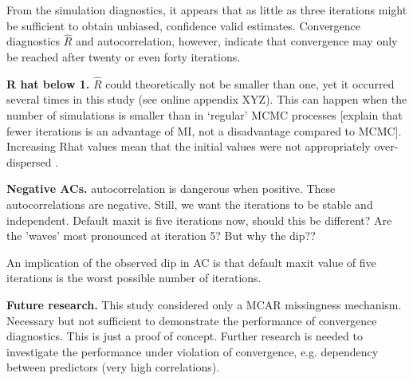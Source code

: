 \documentclass[article]{jss}
\begin{document}
From the simulation diagnostics, it appears that as little as three iterations might be sufficient to obtain unbiased, confidence valid estimates. Convergence diagnostics $\widehat{R}$ and autocorrelation, however, indicate that convergence may only be reached after twenty or even forty iterations. 

\textbf{R hat below 1.}
$\widehat{R}$ could theoretically not be smaller than one, yet it occurred several times in this study (see online appendix XYZ). This can happen when the number of simulations is smaller than in `regular' MCMC processes [explain that fewer iterations is an advantage of MI, not a disadvantage compared to MCMC]. Increasing Rhat values mean that the initial values were not appropriately over-dispersed \citep[p~438]{broo98}. %


\textbf{Negative ACs.} autocorrelation is dangerous when positive. These autocorrelations are negative. Still, we want the iterations to be stable and independent. Default maxit is five iterations now, should this be different? Are the 'waves' most pronounced at iteration 5? But why the dip??  

An implication of the observed dip in AC is that default maxit value of five iterations is the worst possible number of iterations.

\textbf{Future research.} This study considered only a MCAR missingness mechanism. Necessary but not sufficient to demonstrate the performance of convergence diagnostics. This is just a proof of concept. Further research is needed to investigate the performance under violation of convergence, e.g. dependency between predictors (very high correlations). %
\end{document}
